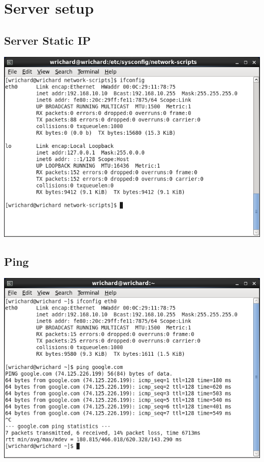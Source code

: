 \documentclass[a4paper,10pt]{article}
\begin{document}
\section{Server setup}
\subsection{Server Static IP}
  \begin{center}
  \includegraphics[width=\linewidth]{./server-ifconfig.png}
  \end{center}

\subsection{Ping}
  \begin{center}
  \includegraphics[width=\linewidth]{./ping.png}
  \end{center}
\end{document}
